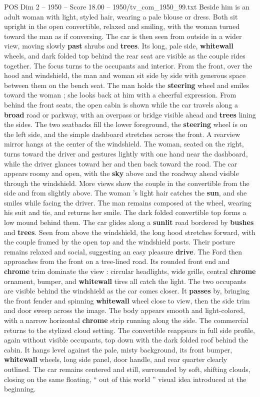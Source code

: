 \begin{textsample}{POS Dim 2 – 1950 – Score 18.00 – 1950/tv\_com\_1950\_99.txt}
Beside him is an adult woman with light, styled hair, wearing a pale blouse or dress.
Both sit upright in the open convertible, relaxed and smiling, with the woman turned toward the man as if conversing.
The car is then seen from outside in a wider view, moving slowly \textbf{past} shrubs and \textbf{trees}.
Its long, pale side, \textbf{whitewall} wheels, and dark folded top behind the rear seat are visible as the couple rides together.
The focus turns to the occupants and interior.
From the front, over the hood and windshield, the man and woman sit side by side with generous space between them on the bench seat.
The man holds the \textbf{steering} wheel and smiles toward the woman ; she looks back at him with a cheerful expression.
From behind the front seats, the open cabin is shown while the car travels along a \textbf{broad} road or parkway, with an overpass or bridge visible ahead and \textbf{trees} lining the sides.
The two seatbacks fill the lower foreground, the \textbf{steering} wheel is on the left side, and the simple dashboard stretches across the front.
A rearview mirror hangs at the center of the windshield.
The woman, seated on the right, turns toward the driver and gestures lightly with one hand near the dashboard, while the driver glances toward her and then back toward the road.
The car appears roomy and open, with the \textbf{sky} above and the roadway ahead visible through the windshield.
More views show the couple in the convertible from the side and from slightly above.
The woman ’s light hair catches the \textbf{sun}, and she smiles while facing the driver.
The man remains composed at the wheel, wearing his suit and tie, and returns her smile.
The dark folded convertible top forms a low mound behind them.
The car glides along a \textbf{sunlit} road bordered by \textbf{bushes} and \textbf{trees}.
Seen from above the windshield, the long hood stretches forward, with the couple framed by the open top and the windshield posts.
Their posture remains relaxed and social, suggesting an easy pleasure \textbf{drive}.
The Ford then approaches from the front on a tree-lined road.
Its rounded front end and \textbf{chrome} trim dominate the view : circular headlights, wide grille, central \textbf{chrome} ornament, bumper, and \textbf{whitewall} tires all catch the light.
The two occupants are visible behind the windshield as the car comes closer.
It \textbf{passes} by, bringing the front fender and spinning \textbf{whitewall} wheel close to view, then the side trim and door sweep across the image.
The body appears smooth and light-colored, with a narrow horizontal \textbf{chrome} strip running along the side.
The commercial returns to the stylized cloud setting.
The convertible reappears in full side profile, again without visible occupants, top down with the dark folded roof behind the cabin.
It hangs level against the pale, misty background, its front bumper, \textbf{whitewall} wheels, long side panel, door handle, and rear quarter clearly outlined.
The car remains centered and still, surrounded by soft, shifting clouds, closing on the same floating, “ out of this world ” visual idea introduced at the beginning.


\end{textsample}
